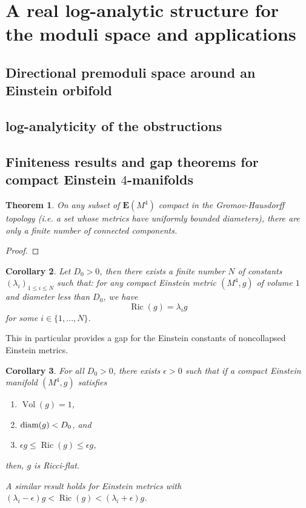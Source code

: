 \documentclass[12pt]{article}
\newtheorem{thm}{Theorem}[section]
\newtheorem{cor}[thm]{Corollary}
\DeclareMathOperator{\vol}{\operatorname{Vol}}
\DeclareMathOperator{\Ric}{\operatorname{Ric}}
\begin{document}
    \section{A real log-analytic structure for the moduli space and applications}
    
    \subsection{Directional premoduli space around an Einstein orbifold}
    
    
    \subsection{log-analyticity of the obstructions}

    \subsection{Finiteness results and gap theorems for compact Einstein $4$-manifolds}

\begin{thm}
    On any subset of $\mathbf{E}(M^4)$ compact in the Gromov-Hausdorff topology (i.e. a set whose metrics have uniformly bounded diameters), there are only a finite number of connected components. 
\end{thm}
\begin{proof}
\end{proof}
    
    \begin{cor}
        Let $D_0>0$, then there exists a finite number $N$ of constants $(\lambda_i)_{1\leqslant i\leqslant N}$ such that: for any compact Einstein metric $(M^4,g)$ of volume $1$ and diameter less than $D_0$, we have
        $$\Ric(g) = \lambda_i g$$
        for some $i\in \{1,...,N\}$.
    \end{cor}

    This in particular provides a gap for the Einstein constants of noncollapsed Einstein metrics.
\begin{cor}
    For all $D_0>0$, there exists $\epsilon>0$ such that if a compact Einstein manifold $(M^4,g)$ satisfies
    \begin{enumerate}
        \item $\vol(g)=1$,
        \item $\textup{diam}(g) < D_0$, and
        \item  $ \epsilon g\leqslant\Ric(g)\leqslant \epsilon g$,
    \end{enumerate}
    then, $g$ is Ricci-flat.
    
    A similar result holds for Einstein metrics with $(\lambda_i-\epsilon)g<\Ric(g)<(\lambda_i+\epsilon)g$.
\end{cor}
\end{document}
